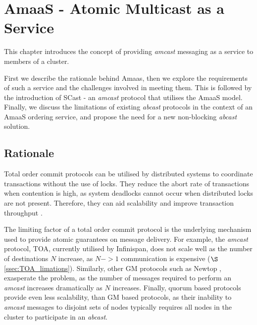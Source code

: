 \chapter{AmaaS - Atomic Multicast as a Service}\label{ch:amaas}

    \graphicspath{{Chapter3-TxService/Figs/Vector/}{Chapter3-TxService/Figs/}}

This chapter introduces the concept of providing \emph{amcast} messaging as a service to members of a cluster.

First we describe the rationale behind \textsf{Amaas}, then we explore the requirements of such a service and the challenges involved in meeting them.  This is followed by the introduction of \textsf{SCast} - an \emph{amcast} protocol that utilises the \textsf{AmaaS} model.  Finally, we discuss the limitations of existing \emph{abcast} protocols in the context of an \textsf{AmaaS} ordering service, and propose the need for a new non-blocking \emph{abcast} solution.  

\section{Rationale}
Total order commit protocols can be utilised by distributed systems to coordinate transactions without the use of locks.  They reduce the abort rate of transactions when contention is high, as system deadlocks cannot occur when distributed locks are not present.  Therefore, they can aid scalability and improve transaction throughput \citep{Ruivo:2011:ETO:2120967.2121604}.  

The limiting factor of a total order commit protocol is the underlying mechanism used to provide atomic guarantees on message delivery.  For example, the \emph{amcast} protocol, TOA, currently utilised by Infinispan, does not scale well as the number of destinations $N$ increase, as $N->1$ communication is expensive ($\S$ \ref{ssec:TOA_limations}).  Similarly, other GM protocols such as Newtop \citep{Ezhilchelvan:1995:NFG:876885.880005}, exasperate the problem, as the number of messages required to perform an \emph{amcast} increases dramatically as $N$ increases.  Finally, quorum based protocols provide even less scalability, than GM based protocols, as their inability to \emph{amcast} messages to disjoint sets of nodes typically requires all nodes in the cluster to participate in an \emph{abcast}.  

